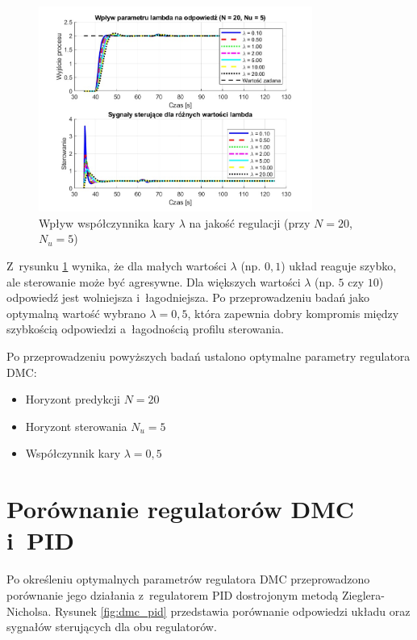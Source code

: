 \documentclass[a4paper,titlepage,11pt,floatssmall]{mwrep}
\begin{document}
\begin{figure}[H]
    \centering
    \includegraphics[width=0.8\textwidth]{kod/wykresy/lambda_porownanie.jpg}
    \caption{Wpływ współczynnika kary $\lambda$ na jakość regulacji (przy $N = 20$, $N_u = 5$)}
    \label{fig:lambda_comparison}
\end{figure}

Z~rysunku \ref{fig:lambda_comparison} wynika, że dla małych wartości $\lambda$ (np. $0,1$) układ reaguje szybko, ale sterowanie może być agresywne. Dla większych wartości $\lambda$ (np. $5$ czy $10$) odpowiedź jest wolniejsza i~łagodniejsza. Po przeprowadzeniu badań jako optymalną wartość wybrano $\lambda = 0,5$, która zapewnia dobry kompromis między szybkością odpowiedzi a~łagodnością profilu sterowania.

Po przeprowadzeniu powyższych badań ustalono optymalne parametry regulatora DMC:
\begin{itemize}
    \item Horyzont predykcji $N = 20$
    \item Horyzont sterowania $N_u = 5$
    \item Współczynnik kary $\lambda = 0,5$
\end{itemize}

\section{Porównanie regulatorów DMC i~PID}

Po określeniu optymalnych parametrów regulatora DMC przeprowadzono porównanie jego działania z~regulatorem PID dostrojonym metodą Zieglera-Nicholsa. Rysunek \ref{fig:dmc_pid} przedstawia porównanie odpowiedzi układu oraz sygnałów sterujących dla obu regulatorów.
\end{document}
